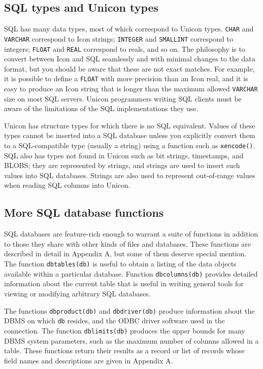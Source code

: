 \subsection*{SQL types and Unicon types}

SQL has many data types, most of which correspond to Unicon types.
\texttt{CHAR} and \texttt{VARCHAR} correspond to Icon
strings; \texttt{INTEGER} and \texttt{SMALLINT} correspond to integers;
\texttt{FLOAT} and \texttt{REAL} correspond to reals, and so on. The
philosophy is to convert between Icon and SQL seamlessly and with
minimal changes to the data format, but you should be aware that these
are not exact matches. For example, it is possible to define a
\texttt{FLOAT} with more precision than an Icon real, and it is easy to
produce an Icon string that is longer than the maximum allowed
\texttt{VARCHAR} size on most SQL servers. Unicon programmers writing
SQL clients must be aware of the limitations of the SQL implementations
they use.

Unicon has structure types for which there is no SQL equivalent. Values
of these types cannot be inserted into a SQL database unless you
explicitly convert them to a SQL-compatible type (usually a string)
using a function such as \texttt{xencode()}.
SQL also has types not found in Unicon such as bit
strings, timestamps, and BLOBS; they are represented
by strings, and strings are used to insert such values into SQL
databases. Strings are also used to represent out-of-range values when
reading SQL columns into Unicon.

\subsection*{More SQL database functions}

SQL databases are feature-rich enough to warrant a suite
of functions in addition to those they
share with other kinds of files and databases. These functions are
described in detail in Appendix A, but some of them deserve special
mention. The function \texttt{dbtables(db)} is useful to obtain a
listing of the data objects available within a particular database.
Function \texttt{dbcolumns(db)} provides detailed information about the
current table that is useful in writing general tools for viewing or
modifying arbitrary SQL databases.

The functions \texttt{dbproduct(db)} and \texttt{dbdriver(db)} produce
information about the DBMS on which \texttt{db} resides, and the
ODBC driver software used in the connection.
The function \texttt{dblimits(db)} produces the upper bounds for many
DBMS system parameters, such as the maximum number of columns allowed
in a table. These functions return their results as
a record or list of records whose field names and descriptions
are given in Appendix A.


